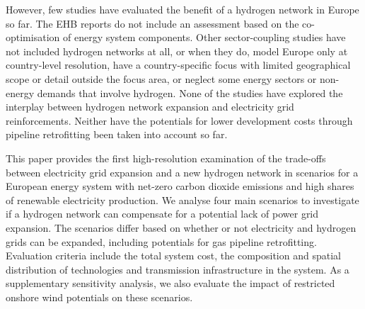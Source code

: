 However, few studies have evaluated the benefit of a hydrogen network in Europe
so far. The EHB reports do not include an assessment based on the
co-optimisation of energy system components.
\cite{gasforclimateEuropeanHydrogen2020,gasforclimateEuropeanHydrogen2021,gasforclimateExtendingEuropean2021,gasforclimateEuropeanHydrogen2022}
Other sector-coupling studies have not included hydrogen networks at all,
\cite{brownSynergiesSector2018,pickeringDiversityOptions2022,childFlexibleElectricity2019,kendziorskiCentralizedDecentral2022}
or when they do, model Europe only at country-level resolution,
\cite{europeancommission.directorategeneralforenergy.METISStudy2021,victoriaSpeedTechnological2022}
have a country-specific focus with limited geographical scope or detail outside the focus area,
\cite{gilsInteractionHydrogen2021} or neglect some energy sectors or non-energy
demands that involve hydrogen.
\cite{gilsInteractionHydrogen2021,Caglayan2019,caglayanRobustDesign2021} None
of the studies have explored the interplay between hydrogen network expansion
and electricity grid reinforcements. Neither have the potentials for lower
development costs through pipeline retrofitting been taken into account so far.

This paper provides the first high-resolution examination of the trade-offs
between electricity grid expansion and a new hydrogen network in scenarios for a
European energy system with net-zero carbon dioxide emissions and high shares of
renewable electricity production. We analyse four main scenarios to investigate
if a hydrogen network can compensate for a potential lack of power grid
expansion. The scenarios differ based on whether or not electricity and hydrogen
grids can be expanded, including potentials for gas pipeline retrofitting.
Evaluation criteria include the total system cost, the composition and spatial
distribution of technologies and transmission infrastructure in the system. As a
supplementary sensitivity analysis, we also evaluate the impact of restricted
onshore wind potentials on these scenarios.


